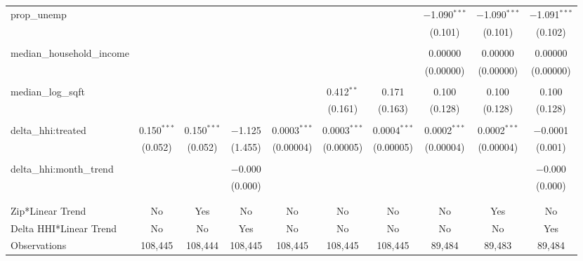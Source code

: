 \begin{table}[H]
{\begin{tabular}{@{\extracolsep{5pt}}lccccccccc}
  prop\_unemp &  &  &  &  &  &  & $-$1.090$^{***}$ & $-$1.090$^{***}$ & $-$1.091$^{***}$ \\  

   &  &  &  &  &  &  & (0.101) & (0.101) & (0.102) \\  

   & & & & & & & & & \\  

  median\_household\_income &  &  &  &  &  &  & 0.00000 & 0.00000 & 0.00000 \\  

   &  &  &  &  &  &  & (0.00000) & (0.00000) & (0.00000) \\  

   & & & & & & & & & \\  

  median\_log\_sqft &  &  &  &  & 0.412$^{**}$ & 0.171 & 0.100 & 0.100 & 0.100 \\  

   &  &  &  &  & (0.161) & (0.163) & (0.128) & (0.128) & (0.128) \\  

   & & & & & & & & & \\  

  delta\_hhi:treated & 0.150$^{***}$ & 0.150$^{***}$ & $-$1.125 & 0.0003$^{***}$ & 0.0003$^{***}$ & 0.0004$^{***}$ & 0.0002$^{***}$ & 0.0002$^{***}$ & $-$0.0001 \\  

   & (0.052) & (0.052) & (1.455) & (0.00004) & (0.00005) & (0.00005) & (0.00004) & (0.00004) & (0.001) \\  

   & & & & & & & & & \\  

  delta\_hhi:month\_trend &  &  & $-$0.000 &  &  &  &  &  & $-$0.000 \\  

   &  &  & (0.000) &  &  &  &  &  & (0.000) \\  

   & & & & & & & & & \\  

 \hline \\[-1.8ex]  

 Zip*Linear Trend & No & Yes & No & No & No & No & No & Yes & No \\  

 Delta HHI*Linear Trend & No & No & Yes & No & No & No & No & No & Yes \\  

 Observations & 108,445 & 108,444 & 108,445 & 108,445 & 108,445 & 108,445 & 89,484 & 89,483 & 89,484 \\  


\end{tabular}}
\end{table}
